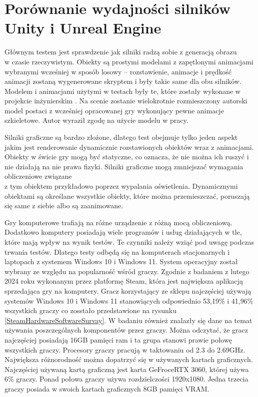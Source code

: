 \documentclass[12pt,twoside]{article}
\begin{document}
\clearpage	
\section{Porównanie wydajności silników Unity i Unreal Engine}


Głównym testem jest sprawdzenie jak silniki radzą sobie z generacją obrazu\\w
czasie rzeczywistym. Obiekty są prostymi modelami z zapętlonymi animacjami
wybranymi wcześniej w sposób losowy – rozstawienie, animacje i prędkość animacji
zostaną wygenerowane skryptem i były takie same dla obu silników. Modelem i
animacjami użytymi w testach były te, które zostały wykonane w projekcie
inżynierskim \cite{ModelSource}. Na scenie zostanie wielokrotnie rozmieszczony
autorski model postaci z wcześniej opracowanej gry wykonujący pewne animacje
szkieletowe. Autor wyraził zgodę na użycie modelu w pracy.


Silniki graficzne są bardzo złożone, dlatego test obejmuje tylko jeden aspekt
jakim jest renderowanie dynamicznie rozstawionych obiektów wraz z animacjami.
Obiekty w świcie gry mogą być statyczne, co oznacza, że nie można ich ruszyć i
nie działają na nie prawa fizyki. Silniki graficzne mogą zmniejszać wymagania
obliczeniowe związane\\z tym obiektem przykładowo poprzez wypalania oświetlenia.
Dynamicznymi obiektami są określane wszystkie obiekty, które można
przemieszczać, poruszają się same z siebie albo są zaanimowane. 

Gry komputerowe trafiają na różne urządzenie z różną mocą obliczeniową.
Dodatkowo komputery posiadają wiele programów i usług działających w tle, które
mają wpływ na wynik testów. Te czynniki należy wziąć pod uwagę podczas trwania
testów. Dlatego testy odbędą się na komputerach stacjonarnych i laptopach z
systemem Windows 10 i Windows 11. System operacyjny został wybrany ze względu na popularność
wśród graczy. Zgodnie z badaniem z lutego 2024 roku wykonanym przez platformę
Steam\cite{SteamSurvey}, która jest największa aplikacją sprzedająca gry na komputery. Gracz
korzystający ze sklepu najczęściej używają systemów Windows 10 i Windows 11
stanowiących odpowiednio 53,19\% i 41,96\% wszystkich graczy co zosstało
przedstawione na rysunku
\ref{SteamHardwareSoftwareSurvay}. W badaniu również znalazły się dane na temat
używania poszczególnych komponentów przez graczy. Można odczytać, że gracz
najczęściej posiadają 16GB pamięci ram i ta grupa stanowi prawie połowę
wszystkich graczy. Procesory graczy pracują w taktowaniu od 2.3 do 2.69GHz.
Największa różnorodność można dopatrzyć się w używanych kartach graficznych.
Najczęściej używaną kartą graficzną jest karta GeFroceRTX 3060, której używa
6\% graczy. Ponad połowa graczy używa rozdzielczości 1920x1080. Jedna trzecia
graczy posiada w swoich kartach graficznych 8GB pamięci VRAM.
\end{document}
